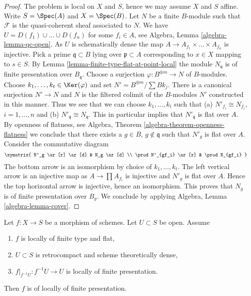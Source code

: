 \begin{proof}
The problem is local on $X$ and $S$, hence we may assume $X$ and $S$ affine.
Write $S = \Spec(A)$ and $X = \Spec(B)$. Let $N$ be a finite $B$-module such
that $\mathcal{F}$ is the quasi-coherent sheaf associated to $N$.
We have $U = D(f_1) \cup \ldots \cup D(f_n)$ for some $f_i \in A$, see
Algebra, Lemma \ref{algebra-lemma-qc-open}.
As $U$ is schematically dense the map
$A \to A_{f_1} \times \ldots \times A_{f_n}$ is injective.
Pick a prime $\mathfrak q \subset B$ lying over $\mathfrak p \subset A$
corresponding to $x \in X$ mapping to $s \in S$.
By Lemma \ref{lemma-finite-type-flat-at-point-local}
the module $N_\mathfrak q$ is of finite presentation over $B_\mathfrak q$.
Choose a surjection $\varphi : B^{\oplus m} \to N$ of $B$-modules.
Choose $k_1, \ldots, k_t \in \Ker(\varphi)$ and
set $N' = B^{\oplus m}/\sum Bk_j$. There is a canonical surjection
$N' \to N$ and $N$ is the filtered colimit of the $B$-modules $N'$
constructed in this manner. Thus we see that we can choose
$k_1, \ldots, k_t$ such that (a) $N'_{f_i} \cong N_{f_i}$, $i = 1, \ldots, n$
and (b) $N'_\mathfrak q \cong N_\mathfrak q$.
This in particular implies that $N'_\mathfrak q$ is flat over $A$.
By openness of flatness, see
Algebra, Theorem \ref{algebra-theorem-openness-flatness}
we conclude that there exists a $g \in B$, $g \not \in \mathfrak q$
such that $N'_g$ is flat over $A$. Consider the commutative diagram
$$
\xymatrix{
N'_g \ar[r] \ar[d] & N_g \ar[d] \\
\prod N'_{gf_i} \ar[r] & \prod N_{gf_i}
}
$$
The bottom arrow is an isomorphism by choice of $k_1, \ldots, k_t$.
The left vertical arrow is an injective map as
$A \to \prod A_{f_i}$ is injective and $N'_g$ is flat over $A$.
Hence the top horizontal arrow is injective, hence an isomorphism.
This proves that $N_g$ is of finite presentation over $B_g$.
We conclude by applying
Algebra, Lemma \ref{algebra-lemma-cover}.
\end{proof}

\begin{lemma}
\label{lemma-flat-finite-type-finitely-presented-over-dense-open-X}
Let $f : X \to S$ be a morphism of schemes. Let $U \subset S$ be open.
Assume
\begin{enumerate}
\item $f$ is locally of finite type and flat,
\item $U \subset S$ is retrocompact and scheme theoretically dense,
\item $f|_{f^{-1}U} : f^{-1}U \to U$ is locally of finite presentation.
\end{enumerate}
Then $f$ is of locally of finite presentation.
\end{lemma}

